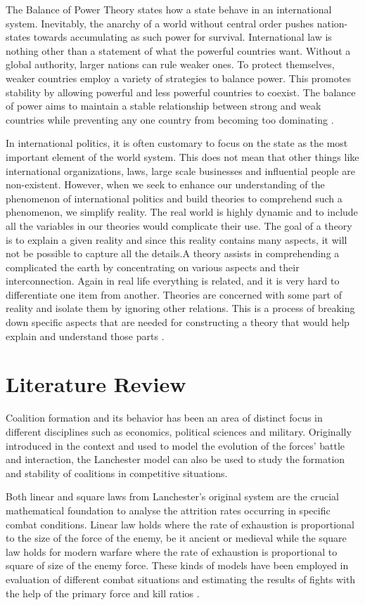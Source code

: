 \documentclass[oneside,12pt]{report}
\begin{document}
The Balance of Power Theory states how a state behave in an international system. Inevitably, the anarchy of a world without central order pushes nation-states towards accumulating as such power for survival. International law is nothing other than a statement of what the powerful countries want. Without a global authority, larger nations can rule weaker ones. To protect themselves, weaker countries employ a variety of strategies to balance power. This promotes stability by allowing powerful and less powerful countries to coexist. The balance of power aims to maintain a stable relationship between strong and weak countries while preventing any one country from becoming too dominating \cite{r3}.

In international politics, it is often customary to focus on the state as the most important element of the world system. This does not mean that other things like international organizations, laws, large scale businesses and influential people are non-existent. However, when we seek to enhance our understanding of the phenomenon of international politics and build theories to comprehend such a phenomenon, we simplify reality. The real world is highly dynamic and to include all the variables in our theories would complicate their use. The goal of a theory is to explain a given reality and since this reality contains many aspects, it will not be possible to capture all the details.A theory assists in comprehending a complicated the earth by concentrating on various aspects and their interconnection. Again in real life everything is related, and it is very hard to differentiate one item from another. Theories are concerned with some part of reality and isolate them by ignoring other relations. This is a process of breaking down specific aspects that are needed for constructing a theory that would help explain and understand those parts \cite{r3}.

 \chapter{Literature Review}
 
Coalition formation and its behavior has been an area of distinct focus in different disciplines such as economics, political sciences and military. Originally introduced in the context and used to model the evolution of the forces’ battle and interaction, the Lanchester model can also be used to study the formation and stability of coalitions in competitive situations.

Both linear and square laws from Lanchester’s original system are the crucial mathematical foundation to analyse the attrition rates occurring in specific combat conditions. Linear law holds where the rate of exhaustion is proportional to the size of the force of the enemy, be it ancient or medieval while the square law holds for modern warfare where the rate of exhaustion is proportional to square of size of the enemy force. These kinds of models have been employed in evaluation of different combat situations and estimating the results of fights with the help of the primary force and kill ratios \cite{r1}.
\end{document}
